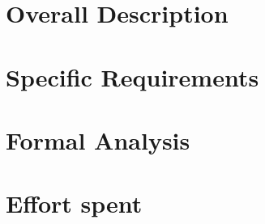 \documentclass[12pt]{article}
\begin{document}
\newpage
\section{Overall Description}
\newpage
\section{Specific Requirements}
\newpage
\section{Formal Analysis}
\newpage
\section{Effort spent}
\end{document}
